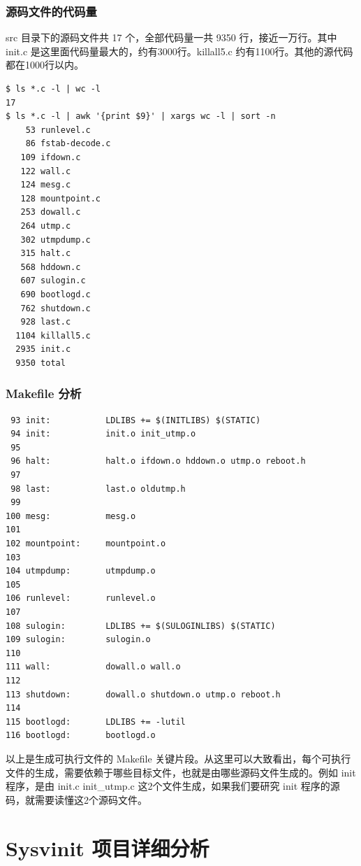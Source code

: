 \subsection{源码文件的代码量}

src 目录下的源码文件共 17 个，全部代码量一共 9350 行，接近一万行。其中
init.c 是这里面代码量最大的，约有3000行。killall5.c
约有1100行。其他的源代码都在1000行以内。

{\begin{shaded}\begin{verbatim}
$ ls *.c -l | wc -l
17
$ ls *.c -l | awk '{print $9}' | xargs wc -l | sort -n
    53 runlevel.c
    86 fstab-decode.c
   109 ifdown.c
   122 wall.c
   124 mesg.c
   128 mountpoint.c
   253 dowall.c
   264 utmp.c
   302 utmpdump.c
   315 halt.c
   568 hddown.c
   607 sulogin.c
   690 bootlogd.c
   762 shutdown.c
   928 last.c
  1104 killall5.c
  2935 init.c
  9350 total
\end{verbatim}\end{shaded}}
\subsection{Makefile 分析}

{\begin{shaded}\begin{verbatim}
 93 init:           LDLIBS += $(INITLIBS) $(STATIC)
 94 init:           init.o init_utmp.o
 95 
 96 halt:           halt.o ifdown.o hddown.o utmp.o reboot.h
 97 
 98 last:           last.o oldutmp.h
 99 
100 mesg:           mesg.o
101 
102 mountpoint:     mountpoint.o
103 
104 utmpdump:       utmpdump.o
105 
106 runlevel:       runlevel.o
107 
108 sulogin:        LDLIBS += $(SULOGINLIBS) $(STATIC)
109 sulogin:        sulogin.o
110 
111 wall:           dowall.o wall.o
112 
113 shutdown:       dowall.o shutdown.o utmp.o reboot.h
114 
115 bootlogd:       LDLIBS += -lutil
116 bootlogd:       bootlogd.o
\end{verbatim}\end{shaded}}
以上是生成可执行文件的 Makefile
关键片段。从这里可以大致看出，每个可执行文件的生成，需要依赖于哪些目标文件，也就是由哪些源码文件生成的。例如
init 程序，是由 init.c init\_utmp.c 这2个文件生成，如果我们要研究 init
程序的源码，就需要读懂这2个源码文件。

\chapter{Sysvinit 项目详细分析}

